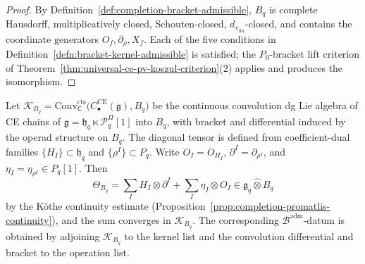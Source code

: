 \begin{proof}
By Definition~\ref{def:completion-bracket-admissible},
\(B_q\) is complete Hausdorff, multiplicatively closed,
Schouten-closed, \(d_{\pi_{\mathrm{lin}}}\)-closed, and contains the
coordinate generators \(O_f,\partial_\rho,X_f\).
Each of the five conditions in
Definition~\ref{defn:bracket-kernel-admissible} is satisfied; the
\(P_0\)-bracket lift criterion of
Theorem~\ref{thm:universal-ce-pv-koszul-criterion}(2) applies and
produces the isomorphism.
\end{proof}

\begin{defn}
\label{def:completion-kernel-admissible}
Let \(\mathcal K_{B_q}=\mathrm{Conv}^{\mathrm{cts}}_{\mathsf C}
\bigl(C^{\mathrm{CE}}_\bullet(\mathfrak g),B_q\bigr)\) be the
continuous convolution dg Lie algebra of CE chains of
\(\mathfrak g=\mathfrak h_q\ltimes\mathcal P^\Pi_q[1]\) into
\(B_q\), with bracket and differential induced by the operad
structure on \(B_q\).  The diagonal tensor
is defined from coefficient-dual families
\(\{H_I\}\subset\mathfrak h_q\) and
\(\{\rho^I\}\subset P_q\).  Write
\(O_I=O_{H_I}\), \(\partial^I=\partial_{\rho^I}\), and
\(\eta_I=\eta_{\rho^I}\in P_q[1]\).  Then
\[
  \Theta_{B_q}
  =\sum_I H_I\otimes\partial^I
   +\sum_I\eta_I\otimes O_I
  \in\mathfrak g_q\widehat\otimes B_q
\]
by the K\"othe continuity
  estimate
  (Proposition~\ref{prop:completion-promatlis-continuity}), and the
  sum converges in \(\mathcal K_{B_q}\).  The corresponding
  \(\mathcal B^{\mathrm{adm}}\)-datum is obtained by adjoining
  \(\mathcal K_{B_q}\) to the kernel list and the convolution differential
  and bracket to the operation list.
\end{defn}

